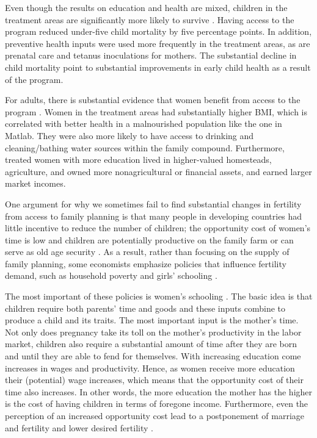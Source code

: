 \documentclass[letterpaper,12pt]{article}
\begin{document}
Even though the results on education and health are mixed, children in
the treatment areas are significantly more likely to survive
\citep{Joshi2007}.
Having access to the program reduced under-five child mortality by five
percentage points.
In addition, preventive health inputs were used more frequently in the
treatment areas, as are prenatal care and tetanus inoculations for
mothers.
The substantial decline in child mortality point to substantial
improvements in early child health as a result of the program.

For adults, there is substantial evidence that women benefit from access
to the program \citep{Joshi2007}.
Women in the treatment areas had substantially higher BMI, which is
correlated with better health in a malnourished population like the one
in Matlab.
They were also more likely to have access to drinking and
cleaning/bathing water sources within the family compound.
Furthermore, treated women with more education lived in higher-valued
homesteads, agriculture, and owned more nonagricultural or financial
assets, and earned larger market incomes.

One argument for why we sometimes fail to find substantial changes in
fertility from access to family planning is that many people in
developing countries had little incentive to reduce the number of
children; the opportunity cost of women's time is low and children are
potentially productive on the family farm or can serve as old age
security \citep{Banerjee2014,Lambert2016}.
As a result, rather than focusing on the supply of family planning, some
economists emphasize policies that influence fertility demand, such as
household poverty and girls' schooling
\citep{pritchett94a,DasGupta2011}.

The most important of these policies is women's schooling
\citep{schultz02}.
The basic idea is that children require both parents' time and goods and
these inputs combine to produce a child and its traits.
The most important input is the mother's time.
Not only does pregnancy take its toll on the mother's productivity in
the labor market, children also require a substantial amount of time
after they are born and until they are able to fend for themselves.
With increasing education come increases in wages and productivity.
Hence, as women receive more education their (potential) wage increases,
which means that the opportunity cost of their time also increases.
In other words, the more education the mother has the higher is the cost
of having children in terms of foregone income.
Furthermore, even the perception of an increased opportunity cost lead
to a postponement of marriage and fertility and lower desired fertility
\citep{Jensen2012}.
\end{document}
